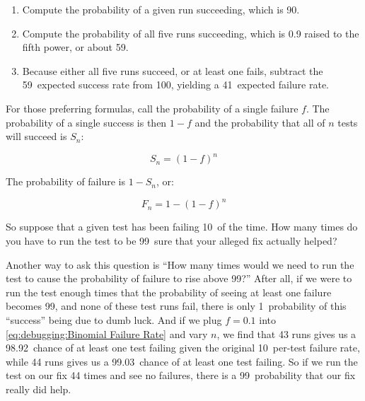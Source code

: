 \begin{enumerate}
\item	Compute the probability of a given run succeeding, which is 90\pct.
\item	Compute the probability of all five runs succeeding, which
	is 0.9 raised to the fifth power, or about 59\pct.
\item	Because either all five runs succeed, or at least one fails,
	subtract the 59\pct\ expected success rate from 100\pct, yielding
	a 41\pct\ expected failure rate.
\end{enumerate}

For those preferring formulas, call the probability of a single failure $f$.
The probability of a single success is then $1-f$ and the probability
that all of $n$ tests will succeed is $S_n$:

\begin{equation}
	S_n = \left(1-f\right)^n
\end{equation}

The probability of failure is $1-S_n$, or:

\begin{equation}
	F_n = 1-\left(1-f\right)^n
\label{eq:debugging:Binomial Failure Rate}
\end{equation}

\QuickQuizEnd

So suppose that a given test has been failing 10\pct\ of the time.
How many times do you have to run the test to be 99\pct\ sure that
your alleged fix actually helped?

Another way to ask this question is ``How many times would we need
to run the test to cause the probability of failure to rise above 99\pct?''
After all, if we were to run the test enough times that the probability
of seeing at least one failure becomes 99\pct, and none of these test
runs fail,
there is only 1\pct\ probability of this ``success'' being due to dumb luck.
And if we plug $f=0.1$ into
\cref{eq:debugging:Binomial Failure Rate} and vary $n$,
we find that 43 runs gives us a 98.92\pct\ chance of at least one test failing
given the original 10\pct\ per-test failure rate,
while 44 runs gives us a 99.03\pct\ chance of at least one test failing.
So if we run the test on our fix 44 times and see no failures, there
is a 99\pct\ probability that our fix really did help.

